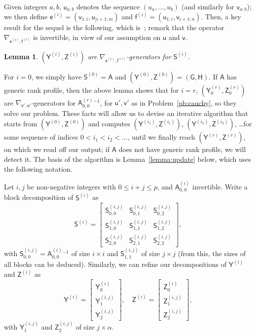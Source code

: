 \documentclass{sig-alternate}
\newcommand{\ve}{\ensuremath{\mathsf{e}}}
\newcommand{\vf}{\ensuremath{\mathsf{f}}}
\newcommand{\vu}{\ensuremath{\mathsf{u}}}
\newcommand{\vv}{\ensuremath{\mathsf{v}}}
\newcommand{\mA}{\ensuremath{\mathsf{A}}}
\newcommand{\mG}{\ensuremath{\mathsf{G}}}
\newcommand{\mH}{\ensuremath{\mathsf{H}}}
\newcommand{\mS}{\ensuremath{\mathsf{S}}}
\newcommand{\mY}{\ensuremath{\mathsf{Y}}}
\newcommand{\mZ}{\ensuremath{\mathsf{Z}}}
\newtheorem{lemma}[definition]{Lemma}
\begin{document}
Given integers $a,b$, $\vu_{a:b}$ denotes the sequence
$(u_a,\dots,u_b)$ (and similarly for $\vv_{a:b}$); we then
define $\ve^{(i)}=(\vv_{1:i},\vu_{[i+1:m})$ and
$\vf^{(i)}=(\vu_{1:i},\vv_{i+1:n})$.
Then, a key result for the sequel is the following, which
is~\cite[Proposition~1]{Cardinal99}; remark that the operator $\nabla_{\ve^{(i)},\vf^{(i)}}$
is invertible, in view of our assumption on $\vu$ and $\vv$.
\begin{lemma}\label{lemma:cpj-cm}
 $(\mY^{(i)},\mZ^{(i)})$ are $\nabla_{\ve^{(i)},\vf^{(i)}}$-generators for $\mS^{(i)}$.
\end{lemma}
For $i=0$, we simply have $\mS^{(0)}=\mA$ and
$(\mY^{(0)},\mZ^{(0)})=(\mG,\mH)$.  If $\mA$ has generic rank profile,
then the above lemma shows that for $i=r$, $(\mY^{(r)}_0,\mZ^{(r)}_0)$
are $\nabla_{\vv',\vu'}$-generators for ${\mA^{(r)}_{0,0}}{}^{-1}$,
for $\vu',\vv'$ as in Problem~\ref{pb:cauchy}, so they solve our
problem.  These facts will allow us to devise an iterative algorithm
that starts from $(\mY^{(0)},\mZ^{(0)})$ and computes
$(\mY^{(i_1)},\mZ^{(i_1)})$, $(\mY^{(i_2)},\mZ^{(i_2)})$, \dots for
some sequence of indices $0 < i_1 < i_2 < \dots$, until we finally
reach $(\mY^{(r)},\mZ^{(r)})$, on which we read off our output; if
$\mA$ does not have generic rank profile, we will detect it. The basis
of the algorithm is Lemma~\ref{lemma:update} below, which uses the
following notation.

Let $i,j$ be non-negative integers with $0
\le i+j \le p$, and ${\mA^{(i)}_{0,0}}$ invertible. Write a block decomposition of $\mS^{(i)}$
as
\begin{equation}\label{eq:Siblock}
\mS^{(i)} = \left [ \begin{matrix} 
\mS^{(i,j)}_{0,0} & \mS^{(i,j)}_{0,1} & \mS^{(i,j)}_{0,2}\\
\mS^{(i,j)}_{1,0} & \mS^{(i,j)}_{1,1} & \mS^{(i,j)}_{1,2}\\
\mS^{(i,j)}_{2,0} & \mS^{(i,j)}_{2,1} & \mS^{(i,j)}_{2,2}
    \end{matrix}\right ],  
\end{equation}
with $\mS^{(i,j)}_{0,0}={\mA^{(i)}_{0,0}}{}^{-1}$ of size $i \times i$ and $\mS^{(i,j)}_{1,1}$
of size $j \times j$ (from this, the sizes of all blocks can
be deduced).  Similarly, we can refine our decompositions of $\mY^{(i)}$ and $\mZ^{(i)}$ as
$$\mY^{(i)}
 = \left [\begin{matrix}
\mY^{(i)}_0 \\\mY^{(i,j)}_1 \\\mY^{(i,j)}_2
   \end{matrix}\right ], \quad
\mZ^{(i)}
 = \left [\begin{matrix}
\mZ^{(i)}_0 \\\mZ^{(i,j)}_1 \\\mZ^{(i,j)}_2
   \end{matrix}\right ],$$
with $\mY^{(i,j)}_1$ and $\mZ^{(i,j)}_2$ of size $j \times \alpha$.
\end{document}
